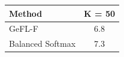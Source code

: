 \begin{tabular}{lc}
\toprule
Method & K = 50\\
\midrule
GeFL-F & 6.8\\
Balanced Softmax & 7.3\\
\bottomrule
\end{tabular}
